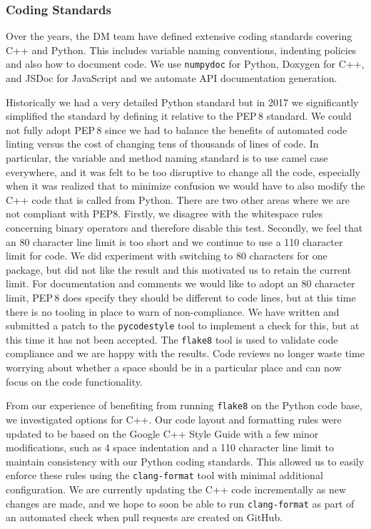 \subsubsection{Coding Standards}
\label{sec:coding-standards}

Over the years, the DM team have defined extensive coding standards\cite{devguide} covering C++ and Python.
This includes variable naming conventions, indenting policies and also how to document code.
We use \texttt{numpydoc}\cite{numpydoc} for Python, Doxygen\cite{doxygen} for C++, and JSDoc\cite{jsdoc} for JavaScript and we automate API documentation generation.

Historically we had a very detailed Python standard but in 2017 we significantly simplified the standard by defining it relative to the PEP\,8 standard\cite{pep8}.
We could not fully adopt PEP\,8 since we had to balance the benefits of automated code linting versus the cost of changing tens of thousands of lines of code.
In particular, the variable and method naming standard is to use camel case everywhere, and it was felt to be too disruptive to change all the code, especially when it was realized that to minimize confusion we would have to also modify the C++ code that is called from Python.
There are two other areas where we are not compliant with PEP8.
Firstly, we disagree with the whitespace rules concerning binary operators and therefore disable this test.
Secondly, we feel that an 80 character line limit is too short and we continue to use a 110 character limit for code.
We did experiment with switching to 80 characters for one package, but did not like the result and this motivated us to retain the current limit.
For documentation and comments we would like to adopt an 80 character limit, PEP\,8 does specify they should be different to code lines, but at this time there is no tooling in place to warn of non-compliance.
We have written and submitted a patch to the \texttt{pycodestyle} tool to implement a check for this, but at this time it has not been accepted.
The \texttt{flake8} tool is used to validate code compliance and we are happy with the results.
Code reviews no longer waste time worrying about whether a space should be in a particular place and can now focus on the code functionality.

From our experience of benefiting from running \texttt{flake8} on the Python code base, we investigated options for C++.
Our code layout and formatting rules were updated to be based on the Google C++ Style Guide\cite{googlestyle} with a few minor modifications, such as 4 space indentation and a 110 character line limit to maintain consistency with our Python coding standards.
This allowed us to easily enforce these rules using the \texttt{clang-format}\cite{clangformat} tool with minimal additional configuration.
We are currently updating the C++ code incrementally as new changes are made, and we hope to soon be able to run \texttt{clang-format} as part of an automated check when pull requests are created on GitHub.

